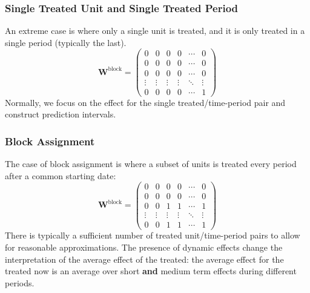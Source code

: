 \documentclass[twoside]{article}
\begin{document}
\subsubsection{Single Treated Unit and Single Treated Period}
An extreme case is where only a single unit is treated, and it is only treated in a single period (typically the last). 
\begin{equation*}
    \mathbf{W}^{\text{block}} = \begin{pmatrix}
        0&0&0&0&\cdots &0\\
        0&0&0&0&\cdots &0\\
        0&0&0&0&\cdots &0\\
        \vdots &\vdots & \vdots & \vdots & \ddots & \vdots \\
        0&0&0&0&\cdots &1
    \end{pmatrix}
\end{equation*}
Normally, we focus on the effect for the single treated/time-period pair and construct prediction intervals.

\subsubsection{Block Assignment}
The case of block assignment is where a subset of units is treated every period after a common starting date:
\begin{equation*}
    \mathbf{W}^{\text{block}} = \begin{pmatrix}
        0&0&0&0&\cdots &0\\
        0&0&0&0&\cdots &0\\
        0&0&1&1&\cdots &1\\
        \vdots &\vdots & \vdots & \vdots & \ddots & \vdots \\
        0&0&1&1&\cdots &1
    \end{pmatrix}
\end{equation*}
There is typically a sufficient number of treated unit/time-period pairs to allow for reasonable approximations. The presence of dynamic effects change the interpretation of the average effect of the treated: the average effect for the treated now is an average over short \textbf{and} medium term effects during different periods.
\end{document}
